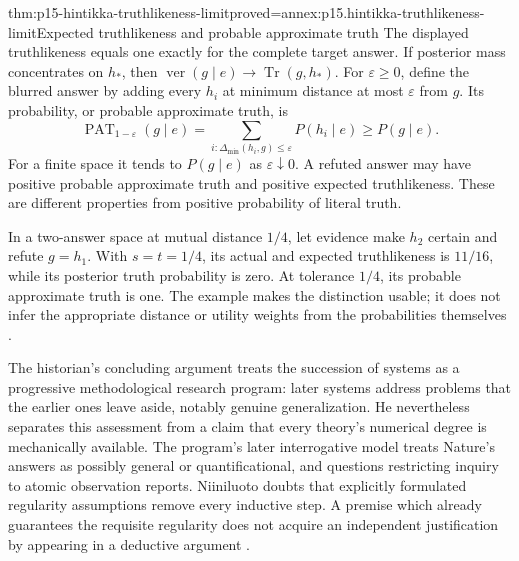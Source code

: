 \begin{hbtheorem}{thm:p15-hintikka-truthlikeness-limit}{proved=annex:p15.hintikka-truthlikeness-limit}{Expected truthlikeness and probable approximate truth}
The displayed truthlikeness equals one exactly for the complete target
answer. If posterior mass concentrates on \(h_*\), then
\(\operatorname{ver}(g\mid e)\to\operatorname{Tr}(g,h_*)\).
For \(\varepsilon\geq0\), define the blurred answer by adding
every \(h_i\) at minimum distance at most \(\varepsilon\)
from \(g\). Its probability, or probable approximate truth, is
\[
 \operatorname{PAT}_{1-\varepsilon}(g\mid e)
   =\sum_{i:\Delta_{\min}(h_i,g)\leq\varepsilon}P(h_i\mid e)
   \geq P(g\mid e).
\]
For a finite space it tends to \(P(g\mid e)\) as
\(\varepsilon\downarrow0\). A refuted answer may have positive
probable approximate truth and positive expected truthlikeness.
These are different properties from positive probability of literal truth.
\end{hbtheorem}

In a two-answer space at mutual distance \(1/4\), let evidence
make \(h_2\) certain and refute \(g=h_1\). With \(s=t=1/4\),
its actual and expected truthlikeness is \(11/16\), while its
posterior truth probability is zero. At tolerance \(1/4\), its
probable approximate truth is one. The example makes the distinction
usable; it does not infer the appropriate distance or utility weights
from the probabilities themselves
\cite[secs.~10--11, pp.~343--348]{Niiniluoto2011HintikkaProgramReading}.

The historian's concluding argument treats the succession of systems
as a progressive methodological research program: later systems address
problems that the earlier ones leave aside, notably genuine
generalization. He nevertheless separates this assessment from a claim
that every theory's numerical degree is mechanically available. The
program's later interrogative model treats Nature's answers as possibly
general or quantificational, and questions restricting inquiry to
atomic observation reports. Niiniluoto doubts that explicitly formulated
regularity assumptions remove every inductive step. A premise which
already guarantees the requisite regularity does not acquire an
independent justification by appearing in a deductive argument
\cite[sec.~12, pp.~349--352]{Niiniluoto2011HintikkaProgramReading}.

